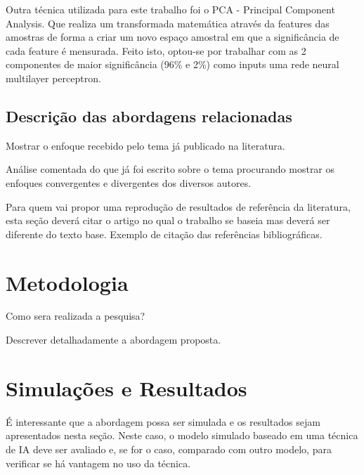 \documentclass{article}
\begin{document}
Outra técnica utilizada para este trabalho foi o PCA - Principal Component Analysis. Que realiza um transformada matemática através da features das amostras de forma a criar um novo espaço amostral em que a significância de cada feature é mensurada. Feito isto, optou-se por trabalhar com as 2 componentes de maior significância (96\% e 2\%) como inputs uma rede neural multilayer perceptron.

\subsection{Descrição das abordagens relacionadas}
\vspace{1cm} Mostrar o enfoque recebido pelo tema já publicado na
literatura. \vspace{1cm}

Análise comentada do que já foi escrito sobre o tema procurando
mostrar os enfoques convergentes e divergentes dos diversos
autores. \vspace{1cm}

Para quem vai propor uma reprodução de resultados de referência da literatura, esta
seção deverá citar o artigo no qual o trabalho se baseia mas deverá ser diferente
do texto base.
Exemplo de citação das referências
bibliográficas.
\vspace{2cm}
\section{Metodologia}
\vspace{1cm} Como sera realizada a pesquisa? \vspace{1cm}

Descrever detalhadamente a abordagem proposta. \vspace{2cm}
\section{Simulações e Resultados}
\vspace{1cm} É interessante que a abordagem possa ser simulada e
os resultados sejam apresentados nesta seção. Neste caso, o modelo
simulado baseado em uma técnica de IA deve ser avaliado e, se for o caso,
comparado com outro modelo, para verificar se há vantagem no uso
da técnica. \vspace{2cm}
\end{document}
